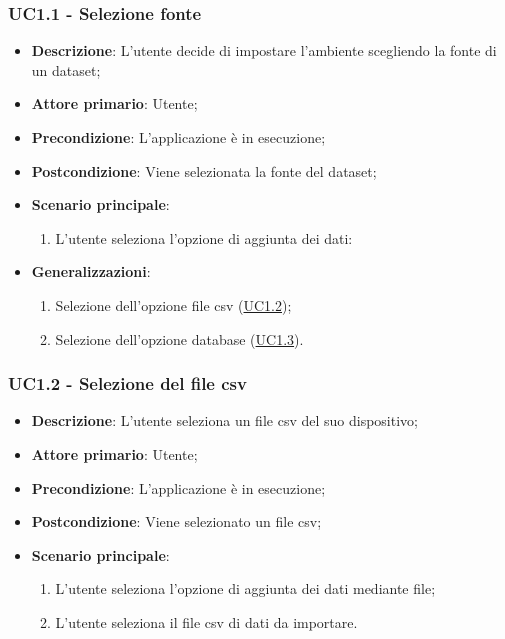 \subsubsection{UC1.1 - Selezione fonte}
\label{ssub:uc1.1}
\begin{itemize}
    \item \textbf{Descrizione}: L'utente decide di impostare l'ambiente scegliendo la fonte di un dataset;

    \item \textbf{Attore primario}: Utente;
        
    \item \textbf{Precondizione}:   L'applicazione è in esecuzione;

    \item \textbf{Postcondizione}:  Viene selezionata la fonte del dataset;

	\item \textbf{Scenario principale}:
		\begin{enumerate}
			\item L'utente seleziona l'opzione di aggiunta dei dati:
        \end{enumerate}

        \item \textbf{Generalizzazioni}:
        \begin{enumerate}
            \item Selezione dell'opzione file csv (\hyperref[ssub:uc1.2]{UC1.2});
            \item Selezione dell'opzione database (\hyperref[ssub:uc1.3]{UC1.3}).
        \end{enumerate}
\end{itemize}


\subsubsection{UC1.2 - Selezione del file csv}
\label{ssub:uc1.2}
\begin{itemize}
    \item \textbf{Descrizione}: L'utente seleziona un file csv del suo dispositivo;

    \item \textbf{Attore primario}: Utente;
    
    \item \textbf{Precondizione}:   L'applicazione è in esecuzione;
    \item \textbf{Postcondizione}:  Viene selezionato un file csv;

	\item \textbf{Scenario principale}:
		\begin{enumerate}
			\item L'utente seleziona l'opzione di aggiunta dei dati mediante file;
			\item L'utente seleziona il file csv di dati da importare.
        \end{enumerate}
\end{itemize}

